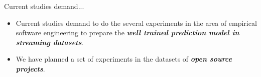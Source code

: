 \documentclass[10pt]{beamer}
\begin{document}

\begin{frame}{Current studies demand...}
\begin{itemize}
        \item Current studies demand to do the several experiments in the area of empirical software engineering to prepare the \textbf{\textit{well trained prediction model in streaming datasets}}.
        \item We have planned a set of experiments in the datasets of \textbf{\textit{open source projects}}. 
\end{itemize}

\end{frame}





%  
%  

\end{document}
